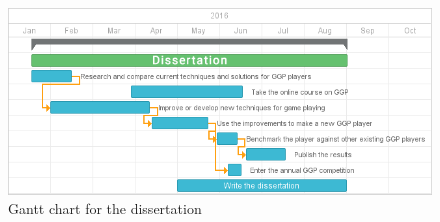 \begin{figure}[h]
	\centering
    \includegraphics[scale=0.6]{images/gantt.png}
    \caption{Gantt chart for the dissertation}
    \label{fig:gantt}
\end{figure}






